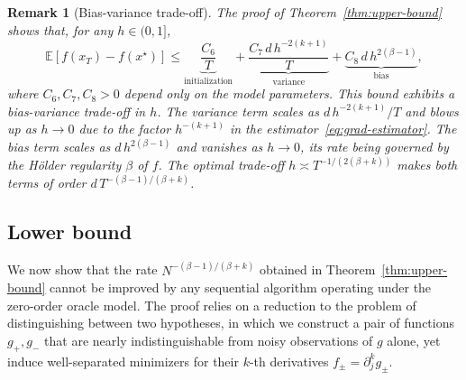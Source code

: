 \documentclass{article}
\newtheorem{remark}{Remark}[section]
\renewcommand{\leq}{\leqslant}
\renewcommand{\geq}{\geqslant}
\theoremstyle{definition}
\begin{document}
\begin{remark}[Bias-variance trade-off]
\label{rem:bias-variance}
The proof of Theorem~\ref{thm:upper-bound} shows that, for any 
$h\in(0,1]$,
\[
\mathbb{E}[f(x_T)-f(x^\star)]
\leq\underbrace{\frac{C_6}{T}}_{\text{initialization}}
+\underbrace{\frac{C_7\,d\,h^{-2(k+1)}}{T}}_{\text{variance}}
+\underbrace{C_8\,d\,h^{2(\beta-1)}}_{\text{bias}},
\]
where $C_6,C_7,C_8>0$ depend only on the model parameters. This 
bound exhibits a bias-variance trade-off in $h$. The 
variance term scales as $d\,h^{-2(k+1)}/T$ and blows up as 
$h\to 0$ due to the factor $h^{-(k+1)}$ in the 
estimator~\eqref{eq:grad-estimator}. The bias term scales as 
$d\,h^{2(\beta-1)}$ and vanishes as $h\to 0$, its rate being 
governed by the H\"older regularity $\beta$ of $f$. The optimal 
trade-off $h\asymp T^{-1/(2(\beta+k))}$ makes both terms of order 
$d\,T^{-(\beta-1)/(\beta+k)}$.




\end{remark}


\subsection{Lower bound}

We now show that the rate $N^{-(\beta-1)/(\beta+k)}$ obtained in 
Theorem~\ref{thm:upper-bound} cannot be improved by any sequential 
algorithm operating under the zero-order oracle model. The proof relies on a reduction to the problem of distinguishing between
two hypotheses, in which we construct a pair of functions $g_+,g_-$ that are nearly indistinguishable from 
noisy observations of $g$ alone, yet induce well-separated 
minimizers for their $k$-th derivatives 
$f_\pm=\partial_j^k g_\pm$. 
\end{document}
